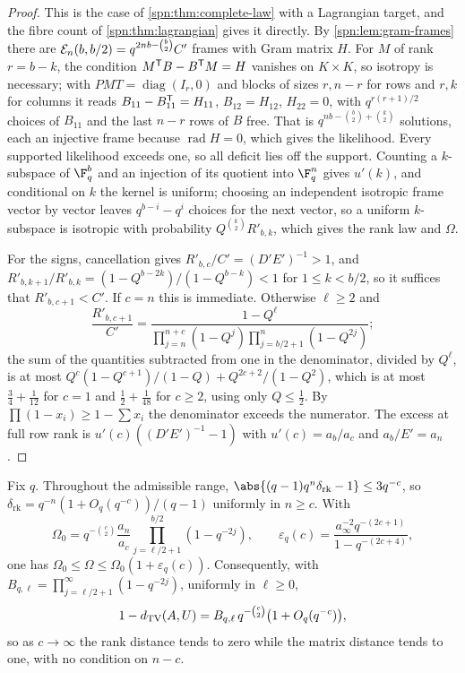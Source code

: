 \begin{proof}
This is the case of \cref{spn:thm:complete-law} with a Lagrangian target, and the fibre count of
\cref{spn:thm:lagrangian} gives it directly. By \cref{spn:lem:gram-frames} there are
$\mathcal{E}_n(b,b/2)=q^{2nb-\binom b2}C'$ frames with Gram matrix $H$. For $M$ of rank $r=b-k$, the
condition $M^{\mathsf{T}}B-B^{\mathsf{T}}M=H$ vanishes on $K\times K$, so isotropy is necessary; with
$PMT=\operatorname{diag}(I_r,0)$ and blocks of sizes $r,n-r$ for rows and $r,k$ for columns it reads
$B_{11}-B_{11}^{\mathsf{T}}=H_{11}$, $B_{12}=H_{12}$, $H_{22}=0$, with $q^{r(r+1)/2}$ choices of $B_{11}$ and
the last $n-r$ rows of $B$ free. That is $q^{nb-\binom b2+\binom k2}$ solutions, each an injective frame
because $\operatorname{rad}H=0$, which gives the likelihood. Every supported likelihood exceeds one, so
all deficit lies off the support. Counting a $k$-subspace of $\F_q^b$ and an injection of its quotient
into $\F_q^n$ gives $u'(k)$, and conditional on $k$ the kernel is uniform; choosing an independent
isotropic frame vector by vector leaves $q^{b-i}-q^i$ choices for the next vector, so a uniform
$k$-subspace is isotropic with probability $Q^{\binom k2}R'_{b,k}$, which gives the rank law and
$\Omega$.

For the signs, cancellation gives $R'_{b,c}/C'=(D'E')^{-1}>1$, and
$R'_{b,k+1}/R'_{b,k}=(1-Q^{b-2k})/(1-Q^{b-k})<1$ for $1\le k<b/2$, so it suffices that
$R'_{b,c+1}<C'$. If $c=n$ this is immediate. Otherwise $\ell\ge2$ and
\[
 \frac{R'_{b,c+1}}{C'}=\frac{1-Q^{\ell}}{\prod_{j=n}^{n+c}(1-Q^j)\prod_{j=b/2+1}^{n}(1-Q^{2j})};
\]
the sum of the quantities subtracted from one in the denominator, divided by $Q^\ell$, is at most
$Q^c(1-Q^{c+1})/(1-Q)+Q^{2c+2}/(1-Q^2)$, which is at most $\tfrac34+\tfrac1{12}$ for $c=1$ and
$\tfrac12+\tfrac1{48}$ for $c\ge2$, using only $Q\le\tfrac12$. By $\prod(1-x_i)\ge1-\sum x_i$ the
denominator exceeds the numerator. The excess at full row rank is
$u'(c)((D'E')^{-1}-1)$ with $u'(c)=a_b/a_c$ and $a_b/E'=a_n$.
\end{proof}

\begin{theorem}\label{spn:thm:wide-separation}
Fix $q$. Throughout the admissible range, $\abs{(q-1)q^n\delta_{\mathrm{rk}}-1}\le3q^{-c}$, so
$\delta_{\mathrm{rk}}=q^{-n}(1+O_q(q^{-c}))/(q-1)$ uniformly in $n\ge c$. With
\[
 \Omega_0=q^{-\binom c2}\frac{a_n}{a_c}\prod_{j=\ell/2+1}^{b/2}(1-q^{-2j}),\qquad
 \varepsilon_q(c)=\frac{a_\infty^{-2}q^{-(2c+1)}}{1-q^{-(2c+4)}},
\]
one has $\Omega_0\le\Omega\le\Omega_0(1+\varepsilon_q(c))$. Consequently, with
$B_{q,\ell}=\prod_{j=\ell/2+1}^\infty(1-q^{-2j})$, uniformly in $\ell\ge0$,
\[
 1-d_{\mathrm{TV}}(A,U)=B_{q,\ell}\,q^{-\binom c2}\bigl(1+O_q(q^{-c})\bigr),
\]
so as $c\to\infty$ the rank distance tends to zero while the matrix distance tends to one, with no
condition on $n-c$.
\end{theorem}

